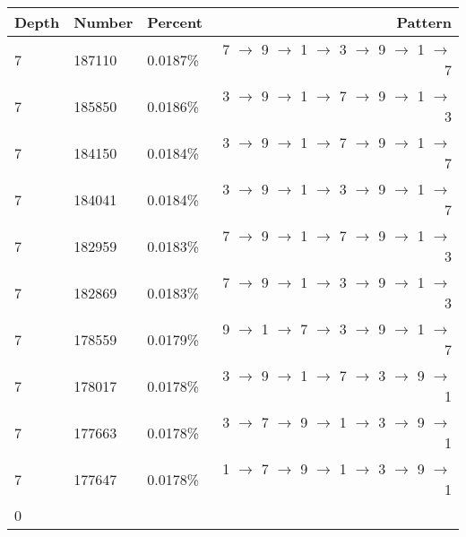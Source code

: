 \documentclass[13pt]{article}
\begin{document}
\begin{tabular}{ l l l r }
  Depth & Number & Percent & Pattern \\
  \hline
  7 & 187110 & 0.0187\% & 7 $\rightarrow$ 9 $\rightarrow$ 1 $\rightarrow$ 3 $\rightarrow$ 9 $\rightarrow$ 1 $\rightarrow$ 7\\
  7 & 185850 & 0.0186\% & 3 $\rightarrow$ 9 $\rightarrow$ 1 $\rightarrow$ 7 $\rightarrow$ 9 $\rightarrow$ 1 $\rightarrow$ 3\\
  7 & 184150 & 0.0184\% & 3 $\rightarrow$ 9 $\rightarrow$ 1 $\rightarrow$ 7 $\rightarrow$ 9 $\rightarrow$ 1 $\rightarrow$ 7\\
  7 & 184041 & 0.0184\% & 3 $\rightarrow$ 9 $\rightarrow$ 1 $\rightarrow$ 3 $\rightarrow$ 9 $\rightarrow$ 1 $\rightarrow$ 7\\
  7 & 182959 & 0.0183\% & 7 $\rightarrow$ 9 $\rightarrow$ 1 $\rightarrow$ 7 $\rightarrow$ 9 $\rightarrow$ 1 $\rightarrow$ 3\\
  7 & 182869 & 0.0183\% & 7 $\rightarrow$ 9 $\rightarrow$ 1 $\rightarrow$ 3 $\rightarrow$ 9 $\rightarrow$ 1 $\rightarrow$ 3\\
  7 & 178559 & 0.0179\% & 9 $\rightarrow$ 1 $\rightarrow$ 7 $\rightarrow$ 3 $\rightarrow$ 9 $\rightarrow$ 1 $\rightarrow$ 7\\
  7 & 178017 & 0.0178\% & 3 $\rightarrow$ 9 $\rightarrow$ 1 $\rightarrow$ 7 $\rightarrow$ 3 $\rightarrow$ 9 $\rightarrow$ 1\\
  7 & 177663 & 0.0178\% & 3 $\rightarrow$ 7 $\rightarrow$ 9 $\rightarrow$ 1 $\rightarrow$ 3 $\rightarrow$ 9 $\rightarrow$ 1\\
  7 & 177647 & 0.0178\% & 1 $\rightarrow$ 7 $\rightarrow$ 9 $\rightarrow$ 1 $\rightarrow$ 3 $\rightarrow$ 9 $\rightarrow$ 1\\
  0
  \end{tabular}
\end{document}
